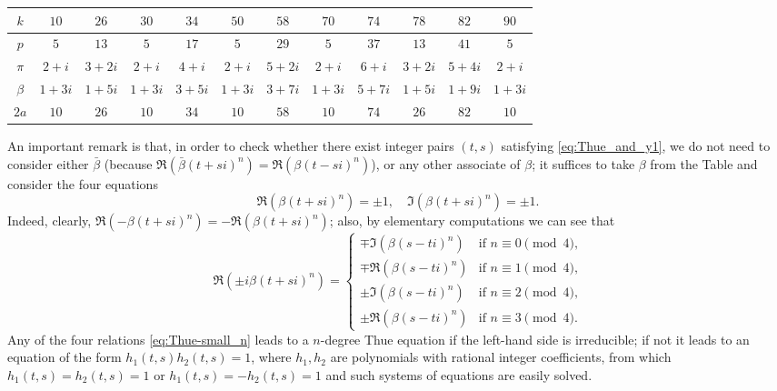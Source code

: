 \documentclass[12pt]{amsart}
\numberwithin{equation}{section}
\theoremstyle{definition}
\theoremstyle{remark}
\begin{document}
\begin{table}[h]
    \centering
    \begin{tabular}{|c||c|c|c|c|c|c|c|c|c|c|c|} \hline
        $k$ & $10$ & $26$ & $30$ & $34$ & $50$ & $58$ & $70$
            & $74$ & $78$ & $82$ & $90$
          \\  \hline
        $p$ & $5$ & $13$ & $5$ & $17$ & $5$ & $29$ & $5$ 
        & $37$ & $13$ & $41$ & $5$
        \\ \hline
       $\pi$ & $2+i$ & $3+2i$ & $2+i$ & $4+i$ & $2+i$ &  $5+2i$ & 
       $2+i$ & $6+i$ & $3+2i$ & $5+4i$ & $2+i$ 
       \\ \hline
       $\beta$ & $1+3i$ & $1+5i$ & $1+3i$ & $3+5i$ & $1+3i$ &
       $3+7i$ & $1+3i$ & $5+7i$ & $1+5i$ & $1+9i$ & $1+3i$
       \\ \hline
       $2a$ & $10$ & $26$ & $10$ & $34$ & $10$ & $58$ & $10$ & $74$ &
       $26$ & $82$ & $10$ 
       \\ \hline
    \end{tabular}
    \label{tab:a-val}
\end{table}
%

\noindent
An important remark is that, in order to check whether there exist 
integer pairs $(t,s)$ satisfying \eqref{eq:Thue_and_y1}, we do 
not need to  consider either $\bar{\beta}$ (because 
$\Re\left(\bar{\beta}(t+si)^n\right)
           =\Re\left(\beta (t-si)^n\right)$), 
or any other associate of $\beta$; it suffices to take $\beta$
from the Table and consider the four equations
%
\begin{equation}  \label{eq:Thue-small_n}
    \Re\left(\beta (t+si)^n\right)=\pm 1, \quad
    \Im\left(\beta (t+si)^n\right) = \pm 1.
\end{equation}
%
Indeed, clearly, 
$\Re\left(-\beta (t+si)^n\right)=-\Re\left(\beta (t+si)^n\right)$;
also, by elementary computations we can see that
%
\begin{equation*}
    \Re\left(\pm i \beta (t+si)^n\right) =
    \begin{cases}
  \mp \Im\left(\beta (s-ti)^n\right) & \mbox{if $n\equiv 0\pmod 4$,}     \\
  \mp \Re\left(\beta (s-ti)^n\right) & \mbox{if $n\equiv 1\pmod 4$,}
   \\
  \pm \Im\left(\beta (s-ti)^n\right) & \mbox{if $n\equiv 2\pmod 4$,}
  \\
 \pm \Re\left(\beta (s-ti)^n\right) & \mbox{if $n\equiv 3\pmod 4$.} 
    \end{cases}
\end{equation*}
%
Any of the four relations \eqref{eq:Thue-small_n} leads to a $n$-degree Thue equation if the left-hand side is irreducible; if not it leads to an equation of the form $h_1(t,s)h_2(t,s)=1$, where $h_1,h_2$ are polynomials with rational integer coefficients, from which $h_1(t,s)=h_2(t,s)=1$ or $h_1(t,s)=-h_2(t,s)=1$ and such systems of equations are easily solved. 
\end{document}

